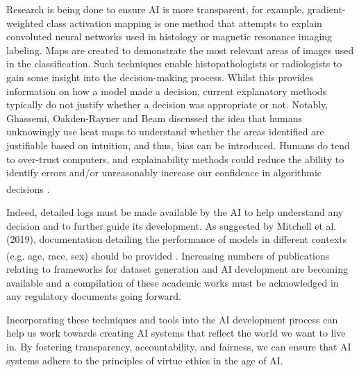 \documentclass[10pt]{article}
\begin{document}
Research is being done to ensure AI is more transparent, for example, gradient-weighted class activation mapping is one method that attempts to explain convoluted neural networks used in histology or magnetic resonance imaging labeling. Maps are created to demonstrate the most relevant areas of images used in the classification. Such techniques enable histopathologists or radiologists to gain some insight into the decision-making process. Whilst this provides information on how a model made a decision, current explanatory methods typically do not justify whether a decision was appropriate or not. Notably, Ghassemi, Oakden-Rayner and Beam discussed the idea that humans unknowingly use heat maps to understand whether the areas identified are justifiable based on intuition, and thus, bias can be introduced. Humans do tend to over-trust computers, and explainability methods could reduce the ability to identify errors and/or unreasonably increase our confidence in algorithmic decisions \textsuperscript{\cite{ghassemi_false_2021}}.

Indeed, detailed logs must be made available by the AI to help understand any decision and to further guide its development. As suggested by Mitchell et al. (2019), documentation detailing the performance of models in different contexts (e.g. age, race, sex) should be provided \textsuperscript{\cite{mitchell_model_2019}}. Increasing numbers of publications relating to frameworks for dataset generation and AI development are becoming available and a compilation of these academic works must be acknowledged in any regulatory documents going forward.

Incorporating these techniques and tools into the AI development process can help us work towards creating AI systems that reflect the world we want to live in. By fostering transparency, accountability, and fairness, we can ensure that AI systems adhere to the principles of virtue ethics in the age of AI.
\end{document}
